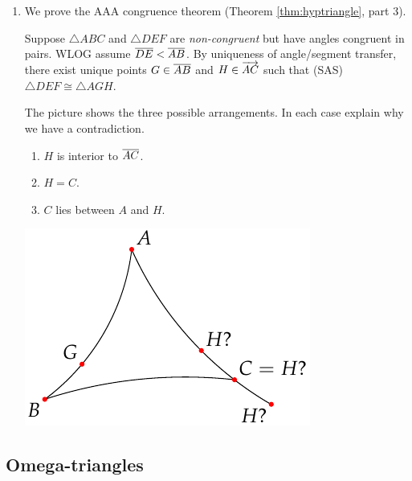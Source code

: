 \begin{exercises}
\begin{enumerate}
	  
	  \item\label{exs:aaacongproof} We prove the AAA congruence theorem (Theorem \ref{thm:hyptriangle}, part 3).\par
	  Suppose $\triangle ABC$ and $\triangle DEF$ are \emph{non-congruent} but have angles congruent in pairs. WLOG assume $\overline{DE}<\overline{AB}$. By uniqueness of angle/segment transfer, there exist unique points $G\in\overline{AB}$ and $H\in\overrightarrow{AC}$ such that (SAS) $\triangle DEF\cong\triangle AGH$.\par
	  \begin{minipage}[t]{0.6\linewidth}\vspace{-8pt}
	  	The picture shows the three possible arrangements. In each case explain why we have a contradiction.
	  	\begin{enumerate}\itemsep0pt
	    	\item $H$ is interior to $\overline{AC}$.
	    	\item $H=C$.
	    	\item $C$ lies between $A$ and $H$.
	  	\end{enumerate}
	   \end{minipage}
	   \hfill
	   \begin{minipage}[t]{0.39\linewidth}\vspace{-25pt}
	    \flushright\includegraphics[scale=0.95]{basic-aaa}
	   \end{minipage}
	\end{enumerate}
\end{exercises}


\clearpage



\subsection{Omega-triangles}\label{sec:omegatri}

